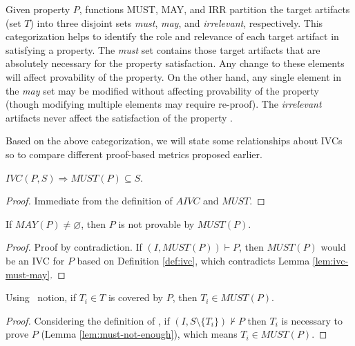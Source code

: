 Given property $P$, functions MUST, MAY, and IRR partition the target artifacts (set $T$) into three disjoint sets \emph{must}, \emph{may}, and \emph{irrelevant}, respectively. This categorization helps to identify the role and relevance of each target artifact in satisfying a property. The \emph{must} set contains those target artifacts that are absolutely necessary for the property satisfaction.  Any change to these elements will affect provability of the property. On the other hand, any single element in the \emph{may} set may be modified without affecting provability of the property (though modifying multiple elements may require re-proof).   The \emph{irrelevant} artifacts never affect the satisfaction of the property \cite{Murugesan16:renext}.

Based on the above categorization, we will state some relationships about IVCs so to compare different proof-based metrics proposed earlier.

\begin{lemma}
  \label{lem:ivc-must-may}
 $IVC(P, S) \Rightarrow  MUST(P) \subseteq S$.
\end{lemma}
\begin{proof}
 Immediate from the definition of $AIVC$ and $MUST$.
\end{proof}
\vspace{2mm}

\begin{lemma}
  \label{lem:must-not-enough}
  If $MAY(P) \neq \varnothing$, then $P$ is not provable by $MUST(P)$.
\end{lemma}
\begin{proof}
  Proof by contradiction. If $(I, MUST(P)) \vdash P$, then $MUST(P)$
  would be an IVC for $P$ based on Definition \ref{def:ivc},
  which contradicts Lemma \ref{lem:ivc-must-may}.
\end{proof}
\vspace{2mm}

\begin{lemma}
  \label{lem:must-coverage}
  Using \nondetcov\ notion, if $T_i \in T$ is covered by $P$, then $T_i \in MUST(P)$.
\end{lemma}
\begin{proof}
Considering the definition of \nondetcov, if
 $(I, S \setminus \{ T_i \}) \nvdash P$ then $T_i$ is necessary to prove $P$ (Lemma \ref{lem:must-not-enough}), which means $T_i \in MUST(P)$.
\end{proof}
\vspace{2mm}

